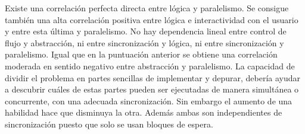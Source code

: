 \documentclass[a4paper, 12pt]{book}
\begin{document}
Existe una correlación perfecta directa entre lógica y paralelismo. Se consigue también una alta correlación positiva entre lógica e interactividad con el usuario y entre esta última y paralelismo. No hay dependencia lineal entre control de flujo y abstracción, ni entre sincronización y lógica, ni entre sincronización y paralelismo. Igual que en la puntuación anterior se obtiene una correlación moderada en sentido negativo entre abstracción y paralelismo. La capacidad de dividir el problema en partes sencillas de implementar y depurar, debería ayudar a descubrir cuáles de estas partes pueden ser ejecutadas de manera simultánea o concurrente, con una adecuada sincronización. Sin embargo el aumento de una habilidad hace que disminuya la otra. Además ambas son independientes de sincronización puesto que solo se usan bloques de espera. 
\end{document}
